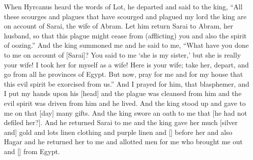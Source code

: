 \begin{translation}
    When Hyrcanus heard  the words of Lot, he departed and said to the king, ``All these scourges and plagues
    that have scourged and plagued my lord the king  are on account of Sarai, the wife of Abram. Let him return Sarai to Abram, her husband,
    so that this plague might cease from (afflicting) you and also the spirit of oozing.'' And the king summoned me and he said to me, ``What have you done to me on account of [Sarai]? You said
    to me `she is my sister,' but she is really your wife! I took her for myself as a wife! Here is your wife; take her, depart, and go from
    all he provinces of Egypt. But now, pray for me and for my house that this evil spirit be exorcised from us.'' And I prayed for him, that blasphemer,
    and I put my hands upon his [head] and the plague was cleansed from him and the evil spirit was driven from him and he lived. And the king stood up and gave
    to me on that [day] many gifts. And the king swore an oath to me that [he had not defiled her?]. And he returned Sarai to me
    and the king gave her much [silver and] gold and lots linen clothing and purple linen and [\hspace{1em}]
    before her and also Hagar and he returned her to me and allotted men for me who brought me out and [\hspace{0.5em}] from Egypt.
\end{translation}